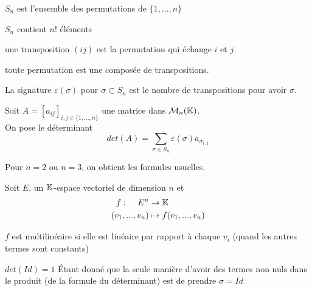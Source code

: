 \documentclass[../main.tex]{subfile}
\begin{document}
\begin{nota}
	$S_n$ est l'ensemble des permutations de $\{1, ..., n\}$
\end{nota}

\begin{rema}
	$S_n$ contient $n!$ éléments
\end{rema}

\begin{defi}
	une transposition $(ij)$ est la permutation qui échange $i$ et $j$.
\end{defi}

\begin{rema}
	toute permutation est une composée de transpositions.
\end{rema}

\begin{defi}
	La signature $\varepsilon(\sigma)$ pour $\sigma \subset S_n$ est le nombre de transpositions pour avoir $\sigma$. 
\end{defi}

\begin{defi}
	Soit $A = \left[a_{ij}\right]_{i,j \in \{1, ..., n\}}$ une matrice dans $\mathcal{M}_n(\mathbb{K})$.\\
	On pose le déterminant 
	$$det(A) = \sum\limits_{\sigma \in S_n} \varepsilon(\sigma)a_{\sigma_{1,1}} $$%
\end{defi}

\begin{rema}
	Pour $n=2$ ou $n=3$, on obtient les formules usuelles.
\end{rema}

\begin{defi}
	Soit $E$, un $\mathbb{K}$-espace vectoriel de dimension $n$ et 
	$$
\begin{aligned}
	f : \phantom{....} E^n &\to \mathbb{K}\\
	(v_1,...,v_n) &\mapsto f(v_1, ..., v_n)
\end{aligned}
	$$

	$f$ est multilinéaire si elle est linéaire par rapport à chaque $v_i$ (quand les autres termes sont constants)
\end{defi}


\begin{rema}
	$det(Id) = 1$ \'Etant donné que la seule manière d'avoir des termes non nuls dans le produit (de la formule du déterminant) est de prendre $\sigma = Id$
\end{rema}
\end{document}
